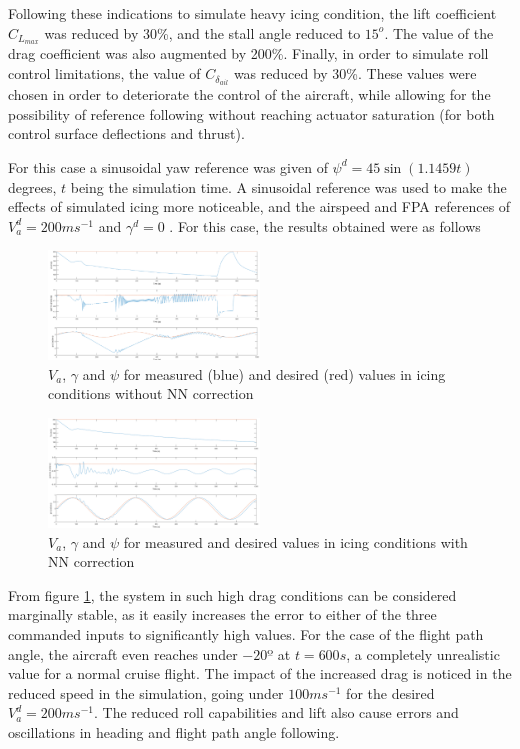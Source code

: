 Following these indications to simulate heavy icing condition, the lift coefficient $C_{L_{max}}$ was reduced by 30\%, and the stall angle reduced to $15^o$. The value of the drag coefficient was also augmented by 200\%. Finally, in order to simulate roll control limitations, the value of $C_{\delta_{ail}}$ was reduced by 30\%. These values were chosen in order to deteriorate the control of the aircraft, while allowing for the possibility of reference following without reaching actuator saturation (for both control surface deflections and thrust). 

For this case a sinusoidal yaw reference was given of $\psi^d= 45 \sin (1.1459t)$ degrees, $t$ being the simulation time. A sinusoidal reference was used to make the effects of simulated icing more noticeable, and the airspeed and FPA references of $V_a^d=200ms^{-1}$ and $\gamma^d=0$ . For this case, the results obtained were as follows

\begin{figure}[h]
\centering
\includegraphics[width=0.5\textwidth]{../Figures/Results/ref_icing.PNG}
\caption[Reference following in icing conditions]{$V_a$, $\gamma$ and $\psi$ for measured (blue) and desired (red) values in icing conditions without NN correction}
\label{fig:ref_icing}
\end{figure}

\begin{figure}[h]
\centering
\includegraphics[width=0.5\textwidth]{../Figures/Results/ref_icing_NN.PNG}
\caption[Reference following in icing conditions with NN correction]{$V_a$, $\gamma$ and $\psi$ for measured and desired values in icing conditions with NN correction}
\label{fig:ref_icing_NN}
\end{figure}

From figure \ref{fig:ref_icing}, the system in such high drag conditions can be considered marginally stable, as it easily increases the error to either of the three commanded inputs to significantly high values. For the case of the flight path angle, the aircraft even reaches under $-20º$ at $t=600s$, a completely unrealistic value for a normal cruise flight. The impact of the increased drag is noticed in the reduced speed in the simulation, going under $100ms^{-1}$ for the desired $V_a^d=200ms^{-1}$. The reduced roll capabilities and lift also cause errors and oscillations in heading and flight path angle following.

